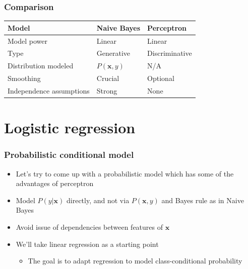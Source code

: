 \documentclass[14pt,mathserif,dvipsnames,usenames]{beamer}
\newcommand{\x}{\mathbf{x}}
\newcommand{\voc}[1]{{\color{ForestGreen}#1}}
\begin{document}
\begin{frame}
  \frametitle{Comparison}
  \begin{center}
  \begin{tabular}{l|l|l}
    Model          & Naive Bayes & Perceptron \\\hline
    Model power    & Linear      & Linear\\
    Type           & Generative  & Discriminative\\
    Distribution 
    modeled        & $P(\x,y)$   & N/A \\
    Smoothing      & Crucial     & Optional\\
    Independence 
    assumptions    & Strong      & None \\
  \end{tabular}   
  \end{center}
\end{frame}


\section{Logistic regression}

\begin{frame}\frametitle{Probabilistic \voc{conditional} model}
  \begin{itemize}
  \item Let's try to come up with a \voc{probabilistic model} which
    has some of the advantages of perceptron
  \item Model $P(y|\x)$ directly, and not via $P(\x,y)$ and Bayes rule
    as in Naive Bayes
  \item Avoid issue of dependencies between features of $\x$
  \item We'll take \voc{linear regression} as a starting point
    \begin{itemize}
    \item The goal is to adapt regression to model class-conditional
      probability 
    \end{itemize}
  \end{itemize}
\end{frame}
\end{document}
